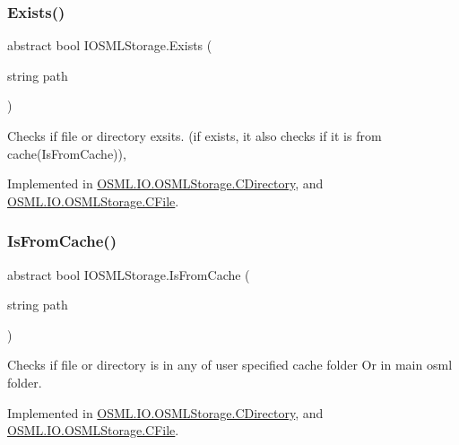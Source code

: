 \mbox{\label{classIOSMLStorage_adc2fa33637c24f1a5c7f3e9dc746c5c6}} 
\subsubsection{\texorpdfstring{Exists()}{Exists()}}
{\footnotesize\ttfamily abstract bool I\+O\+S\+M\+L\+Storage.\+Exists (\begin{DoxyParamCaption}\item[{string}]{path }\end{DoxyParamCaption})\hspace{0.3cm}{\ttfamily [pure virtual]}}



Checks if file or directory exsits. (if exists, it also checks if it is from cache(\+Is\+From\+Cache)), 



Implemented in \mbox{\hyperlink{classOSML_1_1IO_1_1OSMLStorage_1_1CDirectory_ae4616522bb7f9a07084e461ea634965c}{O\+S\+M\+L.\+I\+O.\+O\+S\+M\+L\+Storage.\+C\+Directory}}, and \mbox{\hyperlink{classOSML_1_1IO_1_1OSMLStorage_1_1CFile_ab74c1d57146a48a39bffe7ba6853752c}{O\+S\+M\+L.\+I\+O.\+O\+S\+M\+L\+Storage.\+C\+File}}.

\mbox{\label{classIOSMLStorage_af3e0ef9f76c9739c3e685b1295cdf90a}} 
\subsubsection{\texorpdfstring{IsFromCache()}{IsFromCache()}}
{\footnotesize\ttfamily abstract bool I\+O\+S\+M\+L\+Storage.\+Is\+From\+Cache (\begin{DoxyParamCaption}\item[{string}]{path }\end{DoxyParamCaption})\hspace{0.3cm}{\ttfamily [pure virtual]}}



Checks if file or directory is in any of user specified cache folder Or in main osml folder. 



Implemented in \mbox{\hyperlink{classOSML_1_1IO_1_1OSMLStorage_1_1CDirectory_a7d4783f478aab61af2df5b91c4cc3c7d}{O\+S\+M\+L.\+I\+O.\+O\+S\+M\+L\+Storage.\+C\+Directory}}, and \mbox{\hyperlink{classOSML_1_1IO_1_1OSMLStorage_1_1CFile_ac3c40ae47a8251eaafa0796b67d144c6}{O\+S\+M\+L.\+I\+O.\+O\+S\+M\+L\+Storage.\+C\+File}}.

